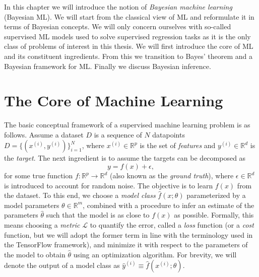 In this chapter we will introduce the notion of \textit{Bayesian machine learning} (Bayesian ML).
We will start from the classical view of ML
and reformulate it in terms of Bayesian concepts. We will only concern ourselves
with so-called supervised ML models used to solve supervised regression tasks
as it is the only class of problems of interest in this thesis.
We will first introduce the core of ML and its constituent ingredients.
From this we transition to Bayes' theorem and a Bayesian framework for ML.
Finally we discuss Bayesian inference.

\section{The Core of Machine Learning}
The basic conceptual framework of a supervised machine learning problem is as follows. 
Assume a dataset $D$ is a sequence of $N$ datapoints $D = \{(x^{(i)}, y^{(i)})\}_{i=1}^N$,
where $x^{(i)} \in \mathbb{R}^p$ is the set of \textit{features} 
and $y^{(i)} \in \mathbb{R}^d$ is the \textit{target}. 
The next ingredient is to assume the targets can be decomposed as
\begin{equation}\label{eq:model_assumption}
	y = f(x) + \epsilon,
\end{equation}
for some true function $f : \mathbb{R}^p \to \mathbb{R}^d$ (also known as the \textit{ground truth}), where $\epsilon \in \mathbb{R}^d$ is introduced to account for random noise. 
The objective is to learn $f(x)$ from the dataset. To this end, we choose a \textit{model class} $\hat{f}(x; \theta)$ 
parameterized by a model parameters $\theta \in \mathbb{R}^m$,
combined with a procedure to infer an estimate of the parameters $\hat{\theta}$ such that the model is as close to $f(x)$ as possible. 
Formally, this means choosing a \textit{metric} $\mathcal{L}$ to quantify the error, called a \textit{loss} function 
(or a \textit{cost} function, but we will adopt the former term in line with the terminology used in the TensorFlow framework), 
and minimize it with respect to the parameters of the model to obtain $\hat{\theta}$ 
using an optimization algorithm. 
For brevity, we will denote the output of a model class as $\hat{y}^{(i)} \equiv \hat{f}(x^{(i)};\theta)$.

\begin{comment}
    \subsection{Model Class and Model Complexity}
    In the last section we used the term model class without any proper definition.
    A model class $\hat{f}(x; \theta)$ is a function parameterized with a parameter $\theta \in \mathbb{R}^d$,
    where $d$ are the dimension of the parameter space. The \textit{model complexity} can loosely be defined as
    how many free parameters there are in the model class, i.e what the number $d$ is.
\end{comment}



